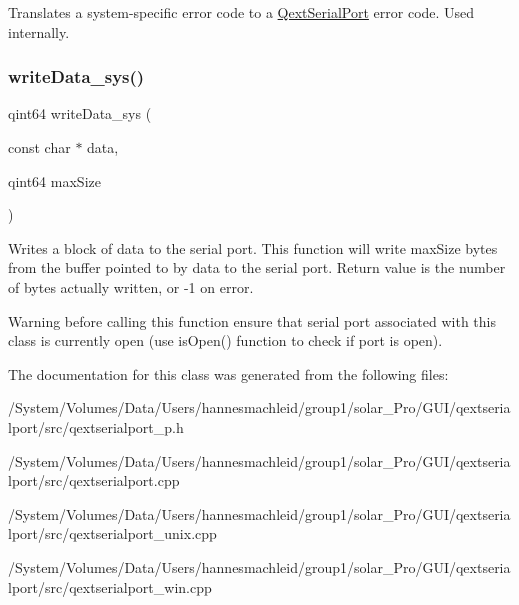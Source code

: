 Translates a system-\/specific error code to a \mbox{\hyperlink{class_qext_serial_port}{Qext\+Serial\+Port}} error code. Used internally. \mbox{\label{class_qext_serial_port_private_af0226826fd063ab5a87d68c4e92458bc}} 
\subsubsection{\texorpdfstring{writeData\_sys()}{writeData\_sys()}}
{\footnotesize\ttfamily qint64 write\+Data\+\_\+sys (\begin{DoxyParamCaption}\item[{const char $\ast$}]{data,  }\item[{qint64}]{max\+Size }\end{DoxyParamCaption})}

Writes a block of data to the serial port. This function will write max\+Size bytes from the buffer pointed to by data to the serial port. Return value is the number of bytes actually written, or -\/1 on error.

\begin{DoxyWarning}{Warning}
before calling this function ensure that serial port associated with this class is currently open (use is\+Open() function to check if port is open). 
\end{DoxyWarning}


The documentation for this class was generated from the following files\+:\begin{DoxyCompactItemize}
\item 
/\+System/\+Volumes/\+Data/\+Users/hannesmachleid/group1/solar\+\_\+\+Pro/\+G\+U\+I/qextserialport/src/qextserialport\+\_\+p.\+h\item 
/\+System/\+Volumes/\+Data/\+Users/hannesmachleid/group1/solar\+\_\+\+Pro/\+G\+U\+I/qextserialport/src/qextserialport.\+cpp\item 
/\+System/\+Volumes/\+Data/\+Users/hannesmachleid/group1/solar\+\_\+\+Pro/\+G\+U\+I/qextserialport/src/qextserialport\+\_\+unix.\+cpp\item 
/\+System/\+Volumes/\+Data/\+Users/hannesmachleid/group1/solar\+\_\+\+Pro/\+G\+U\+I/qextserialport/src/qextserialport\+\_\+win.\+cpp\end{DoxyCompactItemize}
